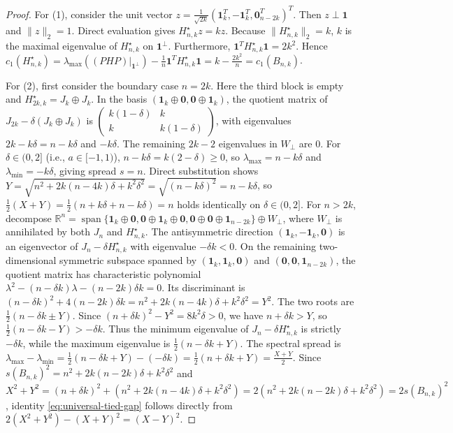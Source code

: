 \documentclass[11pt,reqno]{article}
\theoremstyle{definition}
\newcommand{\R}{\mathbb{R}}
\newcommand{\one}{\mathbf{1}}
\begin{document}
\begin{proof}
For (1), consider the unit vector $z = \frac{1}{\sqrt{2k}}(\one_k^T, -\one_k^T, \mathbf{0}_{n-2k}^T)^T$. Then $z \perp \one$ and $\|z\|_2 = 1$. Direct evaluation gives $H^\star_{n, k} z = k z$. Because $\|H^\star_{n, k}\|_2 = k$, $k$ is the maximal eigenvalue of $H^\star_{n, k}$ on $\one^\perp$. Furthermore, $\one^T H^\star_{n, k} \one = 2k^2$. Hence $c_1(H^\star_{n, k}) = \lambda_{\max}((PHP)|_{\one^\perp}) - \frac{1}{n}\one^T H^\star_{n, k} \one = k - \frac{2k^2}{n} = c_1(B_{n, k})$.

For (2), first consider the boundary case $n = 2k$. Here the third block is empty and $H^\star_{2k, k} = J_k \oplus J_k$. In the basis $(\one_k \oplus \mathbf{0}, \mathbf{0} \oplus \one_k)$, the quotient matrix of $J_{2k} - \delta(J_k \oplus J_k)$ is $\begin{pmatrix} k(1-\delta) & k \\ k & k(1-\delta) \end{pmatrix}$, with eigenvalues $2k - k\delta = n - k\delta$ and $-k\delta$. The remaining $2k-2$ eigenvalues in $W_\perp$ are $0$. For $\delta \in (0, 2]$ (i.e., $a \in [-1, 1)$), $n - k\delta = k(2-\delta) \ge 0$, so $\lambda_{\max} = n - k\delta$ and $\lambda_{\min} = -k\delta$, giving spread $s = n$. Direct substitution shows $Y = \sqrt{n^2 + 2k(n - 4k)\delta + k^2\delta^2} = \sqrt{(n - k\delta)^2} = n - k\delta$, so $\frac{1}{2}(X + Y) = \frac{1}{2}(n + k\delta + n - k\delta) = n$ holds identically on $\delta \in (0, 2]$.
For $n > 2k$, decompose $\R^n = \operatorname{span}\{\one_k \oplus \mathbf{0}, \mathbf{0} \oplus \one_k \oplus \mathbf{0}, \mathbf{0} \oplus \mathbf{0} \oplus \one_{n-2k}\} \oplus W_\perp$, where $W_\perp$ is annihilated by both $J_n$ and $H^\star_{n, k}$. The antisymmetric direction $(\one_k, -\one_k, \mathbf{0})$ is an eigenvector of $J_n - \delta H^\star_{n, k}$ with eigenvalue $-\delta k < 0$. On the remaining two-dimensional symmetric subspace spanned by $(\one_k, \one_k, \mathbf{0})$ and $(\mathbf{0}, \mathbf{0}, \one_{n-2k})$, the quotient matrix has characteristic polynomial $\lambda^2 - (n - \delta k)\lambda - (n - 2k)\delta k = 0$. Its discriminant is $(n - \delta k)^2 + 4(n - 2k)\delta k = n^2 + 2k(n - 4k)\delta + k^2\delta^2 = Y^2$. The two roots are $\frac{1}{2}(n - \delta k \pm Y)$. Since $(n + \delta k)^2 - Y^2 = 8k^2\delta > 0$, we have $n + \delta k > Y$, so $\frac{1}{2}(n - \delta k - Y) > -\delta k$. Thus the minimum eigenvalue of $J_n - \delta H^\star_{n, k}$ is strictly $-\delta k$, while the maximum eigenvalue is $\frac{1}{2}(n - \delta k + Y)$. The spectral spread is $\lambda_{\max} - \lambda_{\min} = \frac{1}{2}(n - \delta k + Y) - (-\delta k) = \frac{1}{2}(n + \delta k + Y) = \frac{X + Y}{2}$.
Since $s(B_{n, k})^2 = n^2 + 2k(n - 2k)\delta + k^2\delta^2$ and $X^2 + Y^2 = (n+\delta k)^2 + (n^2 + 2k(n-4k)\delta + k^2\delta^2) = 2(n^2 + 2k(n-2k)\delta + k^2\delta^2) = 2 s(B_{n, k})^2$, identity \eqref{eq:universal-tied-gap} follows directly from $2(X^2 + Y^2) - (X + Y)^2 = (X - Y)^2$.


\end{proof}
\end{document}
